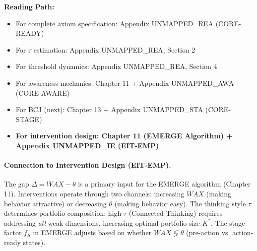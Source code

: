 \begin{cross-reference}
\textbf{Reading Path:}
\begin{itemize}
    \item For complete axiom specification: Appendix UNMAPPED_REA (CORE-READY)
    \item For $\tau$ estimation: Appendix UNMAPPED_REA, Section 2
    \item For threshold dynamics: Appendix UNMAPPED_REA, Section 4
    \item For awareness mechanics: Chapter 11 + Appendix UNMAPPED_AWA (CORE-AWARE)
    \item For BCJ (next): Chapter 13 + Appendix UNMAPPED_STA (CORE-STAGE)
    \item \textbf{For intervention design: Chapter 11 (EMERGE Algorithm) + Appendix UNMAPPED_IE (EIT-EMP)}
\end{itemize}
\end{cross-reference}

\paragraph{Connection to Intervention Design (EIT-EMP).}
The gap $\Delta = WAX - \theta$ is a primary input for the EMERGE algorithm (Chapter 11).
Interventions operate through two channels: increasing $WAX$ (making behavior attractive)
or decreasing $\theta$ (making behavior easy). The thinking style $\tau$ determines
portfolio composition: high $\tau$ (Connected Thinking) requires addressing \emph{all}
weak dimensions, increasing optimal portfolio size $K^*$. The stage factor $f_S$ in EMERGE
adjusts based on whether $WAX \lessgtr \theta$ (pre-action vs. action-ready states).

